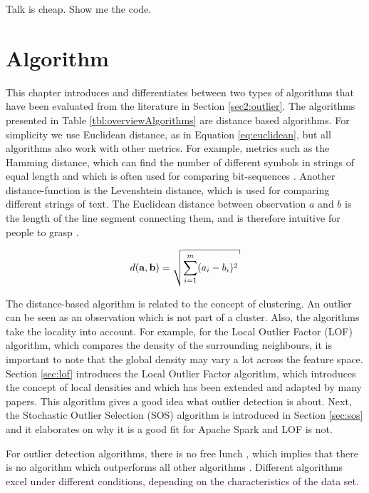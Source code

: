 \begin{savequote}[75mm] 
Talk is cheap. Show me the code.  
\end{savequote}

\chapter{Algorithm \label{chap4:algorithm}}

This chapter introduces and differentiates between two types of algorithms that have been evaluated from the literature in Section \ref{sec2:outlier}. The algorithms presented in Table \ref{tbl:overviewAlgorithms} are distance based algorithms. For simplicity we use Euclidean distance, as in Equation \ref{eq:euclidean}, but all algorithms also work with other metrics. For example, metrics such as the Hamming distance, which can find the number of different symbols in strings of equal length and which is often used for comparing bit-sequences \cite{citeulike:1667687}. Another distance-function is the Levenshtein distance, which is used for comparing different strings of text. The Euclidean distance between observation $a$ and $b$ is the length of the line segment connecting them, and is therefore intuitive for people to grasp \cite{Deza2009EncyclopediaofDistances}.

\begin{equation}
d({\bf a},{\bf b}) = \sqrt{\sum^{m}_{i=1} (a_{i} - b_{i})^2} \label{eq:euclidean}
\end{equation}

The distance-based algorithm is related to the concept of clustering. An outlier can be seen as an observation which is not part of a cluster. Also, the algorithms take the locality into account. For example, for the Local Outlier Factor (LOF) algorithm, which compares the density of the surrounding neighbours, it is important to note that the global density may vary a lot across the feature space. Section \ref{sec:lof} introduces the Local Outlier Factor algorithm, which introduces the concept of local densities and which has been extended and adapted by many papers. This algorithm gives a good idea what outlier detection is about. Next, the Stochastic Outlier Selection (SOS) algorithm is introduced in Section \ref{sec:sos} and it elaborates on why it is a good fit for Apache Spark and LOF is not.

For outlier detection algorithms, there is no free lunch \cite{Wolpert95nofree}, which implies that there is no algorithm which outperforms all other algorithms \cite{outlierselection}. Different algorithms excel under different conditions, depending on the characteristics of the data set.

